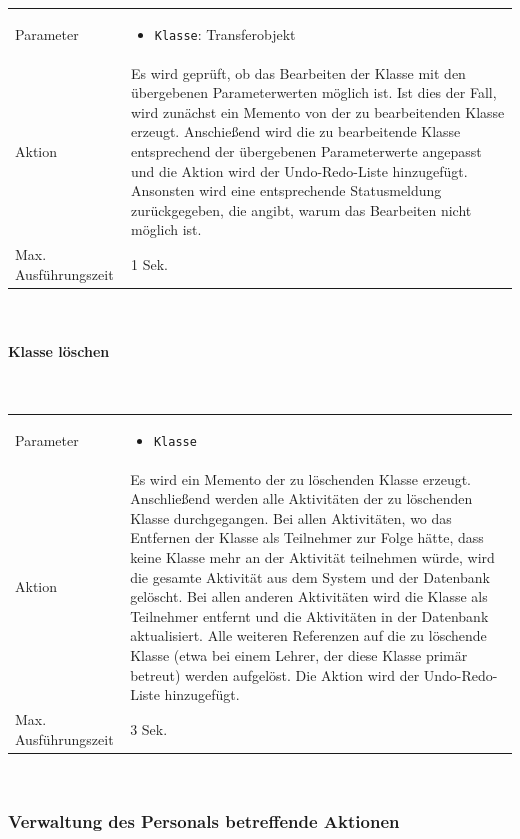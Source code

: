 \documentclass[fontsize=12pt,paper=a4,twoside]{scrartcl}
\begin{document}
\begin{tabularx}{\textwidth}{p{4cm}X}
Parameter & \begin{itemize}[itemsep=0pt, leftmargin = 0.5cm]
			\item \texttt{Klasse}: Transferobjekt
			\end{itemize}\\
Aktion & Es wird geprüft, ob das Bearbeiten der Klasse mit den übergebenen Parameterwerten möglich ist. Ist dies der Fall, wird zunächst ein Memento von der zu bearbeitenden Klasse erzeugt. Anschießend wird die zu bearbeitende Klasse entsprechend der übergebenen Parameterwerte angepasst und die Aktion wird der Undo-Redo-Liste hinzugefügt. Ansonsten wird eine entsprechende Statusmeldung zurückgegeben, die angibt, warum das Bearbeiten nicht möglich ist.\\
Max. Ausführungszeit & 1 Sek. 
\end{tabularx}\\


\paragraph{Klasse löschen}\mbox{}\\

\begin{tabularx}{\textwidth}{p{4cm}X}
Parameter & \begin{itemize}[itemsep=0pt, leftmargin = 0.5cm]
			\item \texttt{Klasse}
			\end{itemize}\\
Aktion & Es wird ein Memento der zu löschenden Klasse erzeugt. Anschließend werden alle Aktivitäten der zu löschenden Klasse durchgegangen. Bei allen Aktivitäten, wo das Entfernen der Klasse als Teilnehmer zur Folge hätte, dass keine Klasse mehr an der Aktivität teilnehmen würde, wird die gesamte Aktivität aus dem System und der Datenbank gelöscht. Bei allen anderen Aktivitäten wird die Klasse als Teilnehmer entfernt und die Aktivitäten in der Datenbank aktualisiert. Alle weiteren Referenzen  auf die zu löschende Klasse (etwa bei einem Lehrer, der diese Klasse primär betreut) werden aufgelöst. Die Aktion wird der Undo-Redo-Liste hinzugefügt.\\
Max. Ausführungszeit & 3 Sek. 
\end{tabularx}\\


\subsubsection{Verwaltung des Personals betreffende Aktionen}
\end{document}

